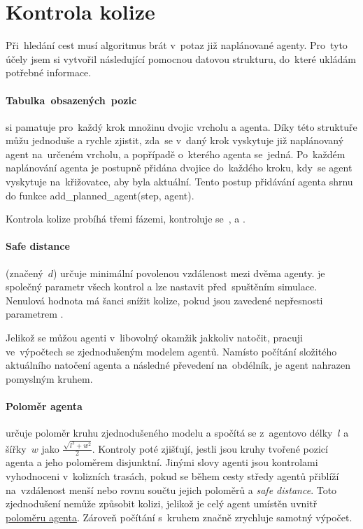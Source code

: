 \section{Kontrola kolize}\label{sec:kolize}


Při~hledání cest musí algoritmus brát v~potaz již naplánované agenty.
Pro~tyto účely jsem si vytvořil následující pomocnou datovou strukturu, do~které ukládám potřebné informace.

\paragraph{Tabulka~obsazených~pozic}\label{par:obsazene_pozice} si pamatuje pro~každý krok množinu dvojic vrcholu a agenta.
Díky této struktuře můžu jednoduše a rychle zjistit,
zda~se v~daný krok vyskytuje již naplánovaný agent na~určeném vrcholu, a popřípadě o~kterého agenta se~jedná.
Po~každém naplánování agenta je postupně přidána dvojice do~každého kroku, kdy~se agent vyskytuje na~křižovatce,
aby byla  aktuální.
Tento postup přidávání agenta shrnu do funkce
\textrm{add\_planned\_agent(step, agent)}.

Kontrola kolize probíhá třemi fázemi, kontroluje se~,
 a .

\paragraph{Safe distance}\label{par:safe_distance} (značený~$d$) určuje minimální povolenou vzdálenost mezi dvěma agenty.
 je společný parametr všech kontrol a lze nastavit před~spuštěním simulace.
Nenulová hodnota  má šanci snížit kolize,
pokud jsou zavedené nepřesnosti parametrem .

Jelikož se můžou agenti v~libovolný okamžik jakkoliv natočit, pracuji ve~výpočtech se zjednodušeným modelem agentů.
Namísto počítání složitého aktuálního natočení agenta a následné převedení na~obdélník,
je agent nahrazen pomyslným kruhem.

\paragraph{Poloměr agenta}\label{par:polomer_agenta} určuje poloměr kruhu zjednodušeného modelu
a spočítá se z~agentovo délky~$l$ a šířky~$w$ jako $\frac{\sqrt {l^2 + w^2}}{2}$.
Kontroly poté zjišťují, jestli jsou kruhy tvořené pozicí agenta a jeho poloměrem disjunktní.
Jinými slovy agenti jsou kontrolami vyhodnoceni v~kolizních trasách,
pokud se během cesty středy agentů přiblíží na~vzdálenost menší nebo rovnu součtu jejich poloměrů a \emph{safe distance}.
Toto zjednodušení nemůže způsobit kolizi, jelikož je celý agent umístěn uvnitř \hyperref[par:polomer_agenta]{poloměru agenta}.
Zároveň počítání s~kruhem značně zrychluje samotný výpočet.

